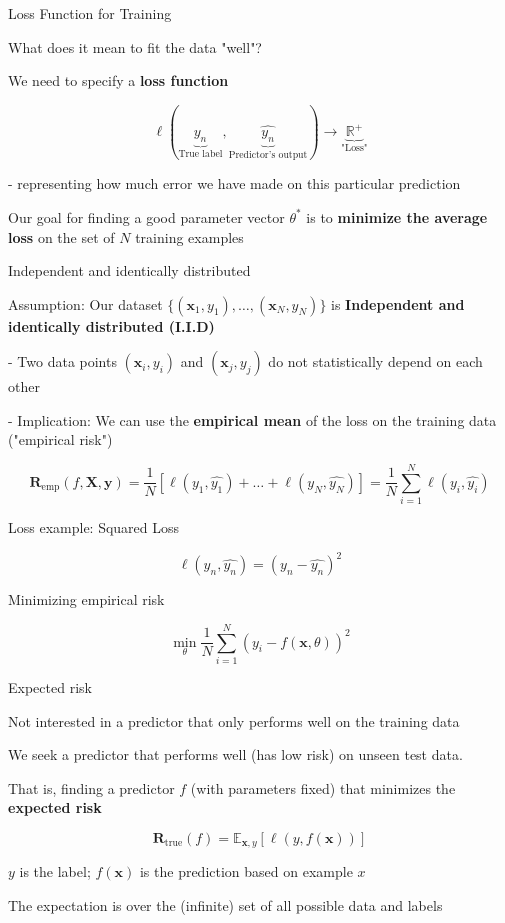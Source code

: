 \documentclass[12pt]{beamer}
\begin{document}
\begin{frame}{Loss Function for Training}

What does it mean to fit the data "well"?

We need to specify a \textbf{loss function}

$$
\ell(\underbrace{y_n}_{\text{True label}}, \underbrace{\hat{y_n}}_{\text{Predictor's output}}) \to \underbrace{\mathbb{R}^{+}}_{\text{"Loss"}}
$$

- representing how much error we have made on this particular prediction

Our goal for finding a good parameter vector $\theta^*$ is to \textbf{minimize the average loss} on the set of $N$ training examples


\end{frame}

\begin{frame}{Independent and identically distributed}

Assumption: Our dataset  $\{(\mathbf{x}_1, y_1), \dots,  (\mathbf{x}_N, y_N)\}$ is \textbf{Independent and identically distributed (I.I.D)}

- Two data points $(\mathbf{x}_i, y_i)$ and $(\mathbf{x}_j, y_j)$ do not statistically depend on each other

- Implication: We can use the \textbf{empirical mean} of the loss on the training data ("empirical risk")

$$
\mathbf{R}_{\mathrm{emp}} (f, \mathbf{X}, \mathbf{y}) = 
\frac{1}{N} \left[ \ell(y_1, \hat{y_1}) + \dots + \ell(y_N, \hat{y_N}) \right] =
\frac{1}{N} \sum_{i = 1}^{N} \ell(y_i, \hat{y_i}) 
$$

\end{frame}

\begin{frame}{Loss example: Squared Loss}

$$
\ell(y_n, \hat{y_n}) = (y_n - \hat{y_n})^2
$$

Minimizing empirical risk

$$
\min_{\theta} \frac{1}{N} \sum_{i = 1}^{N} (y_i - f(\mathbf{x}, \theta))^2
$$


\end{frame}

\begin{frame}{Expected risk}
	
Not interested in a predictor that only performs well on the training data

We seek a predictor that performs well (has low risk) on unseen test data.

That is, finding a predictor $f$ (with parameters fixed) that minimizes the \textbf{expected risk}

$$
\mathbf{R}_{\mathrm{true}} (f) = \mathbb{E}_{\mathbf{x}, y}
\left[ \ell (y, f(\mathbf{x}))   \right]
$$

$y$ is the label; $f(\mathbf{x})$ is the prediction based on example $x$


The expectation is over the (infinite) set of all possible data and labels

\end{frame}
\end{document}
